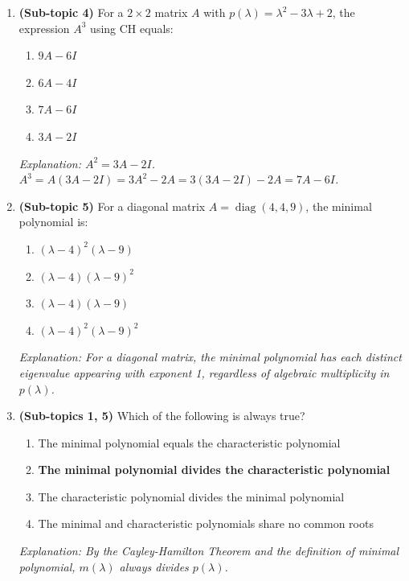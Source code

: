 \documentclass[12pt,a4paper]{article}
\begin{document}
\begin{enumerate}
  \item \textbf{(Sub-topic 4)} For a $2\times2$ matrix $A$ with $p(\lambda)=\lambda^{2}-3\lambda+2$,
        the expression $A^{3}$ using CH equals:
        \begin{enumerate}[label=\Alph*.]
          \item $9A - 6I$
          \item $6A - 4I$
          \item \textbf{$7A - 6I$}
          \item $3A - 2I$
        \end{enumerate}
        \emph{Explanation: $A^{2}=3A-2I$. $A^{3}=A(3A-2I)=3A^{2}-2A=3(3A-2I)-2A=7A-6I$.}

  \item \textbf{(Sub-topic 5)} For a diagonal matrix $A = \operatorname{diag}(4,4,9)$, the minimal
        polynomial is:
        \begin{enumerate}[label=\Alph*.]
          \item $(\lambda-4)^{2}(\lambda-9)$
          \item $(\lambda-4)(\lambda-9)^{2}$
          \item \textbf{$(\lambda-4)(\lambda-9)$}
          \item $(\lambda-4)^{2}(\lambda-9)^{2}$
        \end{enumerate}
        \emph{Explanation: For a diagonal matrix, the minimal polynomial has each distinct eigenvalue
        appearing with exponent 1, regardless of algebraic multiplicity in $p(\lambda)$.}

  \item \textbf{(Sub-topics 1, 5)} Which of the following is always true?
        \begin{enumerate}[label=\Alph*.]
          \item The minimal polynomial equals the characteristic polynomial
          \item \textbf{The minimal polynomial divides the characteristic polynomial}
          \item The characteristic polynomial divides the minimal polynomial
          \item The minimal and characteristic polynomials share no common roots
        \end{enumerate}
        \emph{Explanation: By the Cayley-Hamilton Theorem and the definition of minimal polynomial,
        $m(\lambda)$ always divides $p(\lambda)$.}
\end{enumerate}
\end{document}

